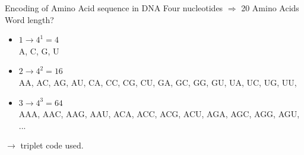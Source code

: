 \documentclass[pdf]{beamer}
\begin{document}
\begin{frame}{Encoding of Amino Acid sequence in DNA}
  Four nucleotides $\Rightarrow$  20 Amino Acids\\Word length?
  \begin{itemize}
    \item $1 \rightarrow 4^1 = 4 $\\
      A, C, G, U
      \pause
    \item $2 \rightarrow 4^2 = 16$\\
      AA, AC, AG, AU, CA, CC, CG, CU, GA, GC, GG, GU, UA, UC, UG, UU, 
      \pause
    \item $3 \rightarrow 4^3 = 64$\\
      AAA, AAC, AAG, AAU, ACA, ACC, ACG, ACU, AGA, AGC, AGG, AGU, ...
  \end{itemize}
  \pause
  $\rightarrow$ triplet code used.
\end{frame}
\end{document}
